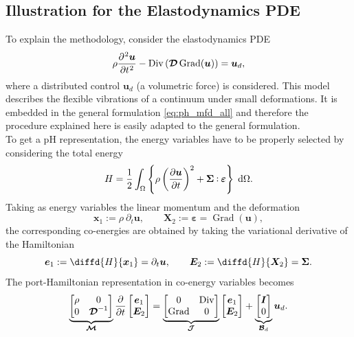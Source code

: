 \documentclass{svjour3}                     %
\DeclareMathOperator*{\Grad}{Grad}
\DeclareMathOperator*{\Div}{Div}
\def\onedot{$\mathsurround0pt\ldotp$}
\def\cddot{%
	\mathbin{\vcenter{\baselineskip.67ex
			\hbox{\onedot}\hbox{\onedot}}%
}}
\newcommand{\secondRev}[1]{\textcolor{blue!80!black}{#1}}
\begin{document}
	\subsection{Illustration for the Elastodynamics PDE}
	To explain the methodology, consider the elastodynamics PDE
	\begin{equation*}
	\rho \diffp[2]{\bm{u}}{t} - \Div\left(\bm{\mathcal{D}} \Grad(\bm{u})\right) = \bm{u}_d,
	\end{equation*}
	where a distributed control $\bm{u}_d$ (a volumetric force) is considered. This model describes the flexible vibrations of a continuum under small deformations. It is embedded in the general formulation \eqref{eq:ph_mfd_all} and therefore the procedure explained here is easily adapted to the general formulation. \\
	To get a pH representation, the energy variables have to be properly selected by considering the total energy
	\begin{equation}
	\label{eq:en_eldyn}
	\displaystyle H = \frac{1}{2} \int_{\Omega} \left\{\rho \left(\diffp{\bm{u}}{t}\right)^2 + \bm\Sigma \cddot \bm\varepsilon \right\} \d{\Omega}.
	\end{equation}
	\secondRev{
		Taking as energy variables the linear momentum and the deformation
		\begin{equation}
		\bm{x}_1 := \rho \ \partial_t \bm{u}, \qquad \bm{X}_2 := \bm\varepsilon = \Grad(\bm{u}), 
		\end{equation}
		the corresponding co-energies are obtained by taking the variational derivative of the Hamiltonian
		\begin{equation}
		\bm{e}_1 := \diffd{H}{\bm{x}_1} =  \partial_t \bm{u}, \qquad
		\bm{E}_2 := \diffd{H}{\bm{X}_2} = \bm\Sigma.
		\end{equation}
	}
	The port-Hamiltonian representation in co-energy variables becomes
	\begin{equation*}
	\underbrace{\begin{bmatrix}
		\rho & 0 \\ 0 & \bm{\mathcal{D}}^{-1} \\
		\end{bmatrix}}_{\bm{\mathcal{M}}}
	\diffp{}{t}
	\begin{bmatrix}
	\bm{e}_1 \\ \bm{E}_2 \\
	\end{bmatrix} = 
	\underbrace{\begin{bmatrix}
		0 & \Div \\ \Grad & 0 \\
		\end{bmatrix}}_{\bm{\mathcal{J}}}
	\begin{bmatrix}
	\bm{e}_1 \\ \bm{E}_2 \\
	\end{bmatrix} + 
	\underbrace{\begin{bmatrix}
		\bm{I} \\ 0 \\
		\end{bmatrix}}_{\bm{\mathcal{B}}_d} \bm{u}_d.
	\end{equation*}
\end{document}
